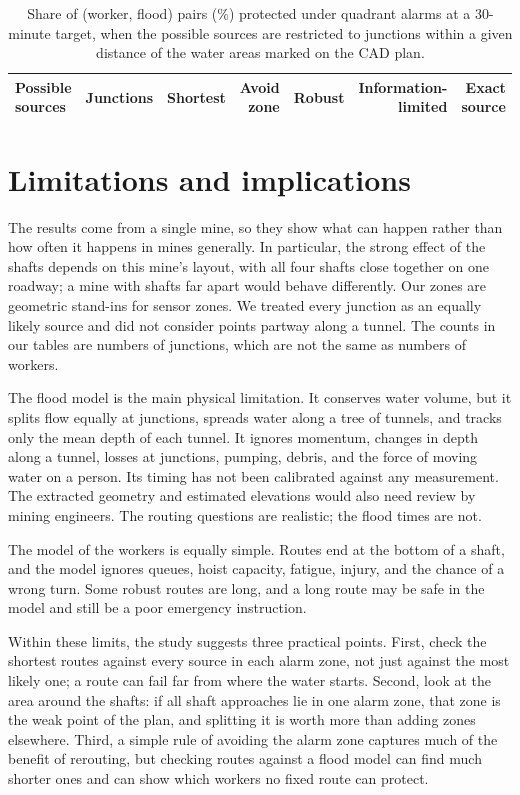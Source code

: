 \documentclass[11pt,a4paper]{article}
\begin{document}
\begin{table}[htbp]
\centering\small
\caption{Share of (worker, flood) pairs (\%) protected under quadrant alarms at a 30-minute target, when the possible sources are restricted to junctions within a given distance of the water areas marked on the CAD plan.}\label{tab:breadth}
\begin{tabular}{@{}lrrrrrr@{}}\toprule
Possible sources & Junctions & Shortest & Avoid zone & Robust & Information-limited & Exact source\\\midrule

\end{tabular}
\end{table}

\section{Limitations and implications}\label{sec:limits}
The results come from a single mine, so they show what can happen rather than how often it happens in mines generally. In particular, the strong effect of the shafts depends on this mine's layout, with all four shafts close together on one roadway; a mine with shafts far apart would behave differently. Our zones are geometric stand-ins for sensor zones. We treated every junction as an equally likely source and did not consider points partway along a tunnel. The counts in our tables are numbers of junctions, which are not the same as numbers of workers.

The flood model is the main physical limitation. It conserves water volume, but it splits flow equally at junctions, spreads water along a tree of tunnels, and tracks only the mean depth of each tunnel. It ignores momentum, changes in depth along a tunnel, losses at junctions, pumping, debris, and the force of moving water on a person. Its timing has not been calibrated against any measurement. The extracted geometry and estimated elevations would also need review by mining engineers. The routing questions are realistic; the flood times are not.

The model of the workers is equally simple. Routes end at the bottom of a shaft, and the model ignores queues, hoist capacity, fatigue, injury, and the chance of a wrong turn. Some robust routes are long, and a long route may be safe in the model and still be a poor emergency instruction.

Within these limits, the study suggests three practical points. First, check the shortest routes against every source in each alarm zone, not just against the most likely one; a route can fail far from where the water starts. Second, look at the area around the shafts: if all shaft approaches lie in one alarm zone, that zone is the weak point of the plan, and splitting it is worth more than adding zones elsewhere. Third, a simple rule of avoiding the alarm zone captures much of the benefit of rerouting, but checking routes against a flood model can find much shorter ones and can show which workers no fixed route can protect.
\end{document}
